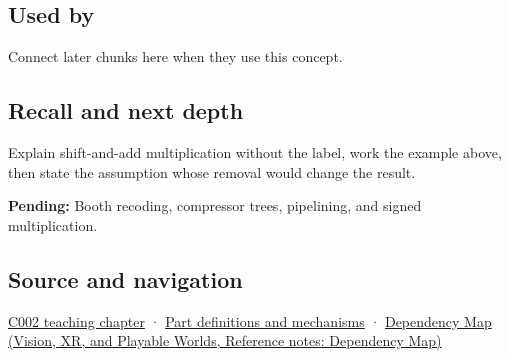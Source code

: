 \subsection{Used by}\label{appendix-a65290d66ed9-used-by}

\hypertarget{appendix-a65290d66ed9-used-by}{}

Connect later chunks here when they use this concept.

\subsection{Recall and next depth}\label{appendix-a65290d66ed9-recall-and-next-depth}

\hypertarget{appendix-a65290d66ed9-recall-and-next-depth}{}

Explain shift-and-add multiplication without the label, work the example above, then state the assumption whose removal would change the result.

\textbf{Pending:} Booth recoding, compressor trees, pipelining, and signed multiplication.

\subsection{Source and navigation}\label{appendix-a65290d66ed9-source-and-navigation}

\hypertarget{appendix-a65290d66ed9-source-and-navigation}{}

\hyperref[01-foundations-i-ch001-arithmetic-becomes-a-policy]{C002 teaching chapter} · \hyperref[appendix-fd090d982a15]{Part definitions and mechanisms} · \href{../07-Vision-XR-and-Playable-Worlds/main.pdf\#nameddest=appendix-4ad47bdd269a}{Dependency Map (Vision, XR, and Playable Worlds, Reference notes: Dependency Map)}
